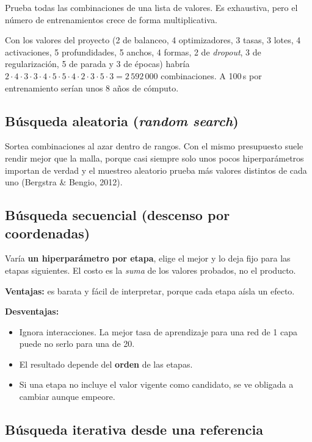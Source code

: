 \documentclass[11pt,a4paper]{article}
\begin{document}
Prueba todas las combinaciones de una lista de valores. Es exhaustiva, pero el número de entrenamientos crece de forma multiplicativa.

\begin{ejemplo}
Con los valores del proyecto (2 de balanceo, 4 optimizadores, 3 tasas, 3 lotes, 4 activaciones, 5 profundidades, 5 anchos, 4 formas, 2 de \textit{dropout}, 3 de regularización, 5 de parada y 3 de épocas) habría
$2\cdot4\cdot3\cdot3\cdot4\cdot5\cdot5\cdot4\cdot2\cdot3\cdot5\cdot3 = 2\,592\,000$ combinaciones. A 100\,s por entrenamiento serían unos 8 años de cómputo.
\end{ejemplo}

\subsection{Búsqueda aleatoria (\textit{random search})}

Sortea combinaciones al azar dentro de rangos. Con el mismo presupuesto suele rendir mejor que la malla, porque casi siempre solo unos pocos hiperparámetros importan de verdad y el muestreo aleatorio prueba más valores distintos de cada uno (Bergstra \& Bengio, 2012).

\subsection{Búsqueda secuencial (descenso por coordenadas)}

Varía \textbf{un hiperparámetro por etapa}, elige el mejor y lo deja fijo para las etapas siguientes. El costo es la \emph{suma} de los valores probados, no el producto.

\textbf{Ventajas:} es barata y fácil de interpretar, porque cada etapa aísla un efecto.

\textbf{Desventajas:}
\begin{itemize}
\item Ignora interacciones. La mejor tasa de aprendizaje para una red de 1 capa puede no serlo para una de 20.
\item El resultado depende del \textbf{orden} de las etapas.
\item Si una etapa no incluye el valor vigente como candidato, se ve obligada a cambiar aunque empeore.
\end{itemize}

\subsection{Búsqueda iterativa desde una referencia}
\end{document}
